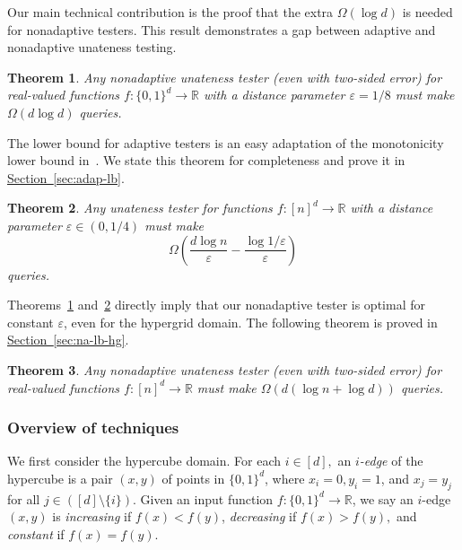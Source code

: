 \documentclass[11pt]{article}
\numberwithin{equation}{section}
\newtheorem{theorem}{Theorem}[section]
\theoremstyle{definition}
\theoremstyle{plain}
\newcommand{\R}{\mathbb R}
\newcommand{\expref}[2]{\hyperref[#2]{#1~\ref{#2}}}
\newcommand{\eps}{\varepsilon}
\newcommand{\Sec}[1]{\expref{Section}{sec:#1}}
\begin{document}
Our main technical contribution is the proof that the extra $\Omega(\log d)$ is needed for nonadaptive testers.
This result demonstrates a gap between adaptive and nonadaptive unateness testing.

\begin{theorem}\label{thm:non-adap-lb-1}
Any nonadaptive unateness tester (even with two-sided error) for real-valued functions $f:\{0,1\}^d \to \R$ with
a %
distance parameter $\eps = 1/8$  must make $\Omega(d\log d)$ queries.
\end{theorem}


The lower bound for adaptive testers is an easy adaptation of the monotonicity lower bound in~\cite{CS14}.
We state this theorem for completeness and prove it in \Sec{adap-lb}.
\begin{theorem}\label{thm:adap-lb}
  Any unateness tester  for functions $f:[n]^d \to \R$ with 
  a %
  distance parameter $\eps \in (0,1/4)$ must make
  \[
    \Omega\left(\frac{d \log n}{\eps}-\frac{\log 1/\eps}{\eps}\right)
  \]
  queries.
\end{theorem}

Theorems~\ref{thm:non-adap-lb-1} and~\ref{thm:adap-lb} directly imply that our nonadaptive tester is optimal for constant $\eps$, even for the hypergrid domain.
The following theorem is proved in
\Sec{na-lb-hg}.

\begin{theorem}\label{thm:na-lb-hg}
Any nonadaptive unateness tester (even with two-sided error) for real-valued functions $f:[n]^d \to \R$ must make $\Omega(d(\log n + \log d))$ queries.
\end{theorem}


\subsubsection{Overview of techniques}\label{sec:intro-tech}
We first consider the hypercube domain. For each $i\in[d],$ an \emph{$i$-edge} of the hypercube is a pair $(x,y)$ of points in $\{0,1\}^d$, where $x_i=0,y_i=1$, and $x_j=y_j$ for all $j\in([d] \setminus \{i\})$. Given an input function $f:\{0,1\}^d\to\R$, we say an $i$-edge $(x,y)$ is \emph{increasing} if $f(x)<f(y)$, \emph{decreasing} if $f(x)>f(y),$ and \emph{constant} if $f(x)=f(y)$.
\end{document}
